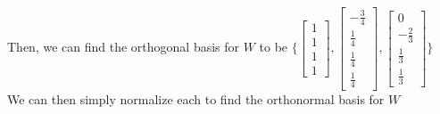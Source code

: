 \documentclass{report}
\begin{document}
\begin{center}
	Then, we can find the orthogonal basis for $W$ to be $\{\begin{bmatrix} 1 \\ 1 \\ 1 \\ 1 \end{bmatrix}, \begin{bmatrix} -\frac{3}{4} \\ \frac{1}{4} \\ \frac{1}{4} \\ \frac{1}{4} \end{bmatrix}, \begin{bmatrix} 0 \\ -\frac{2}{3} \\ \frac{1}{3} \\ \frac{1}{3} \end{bmatrix} \}$\\\vspace{3mm}
	We can then simply normalize each to find the orthonormal basis for $W$
\end{center}
\end{document}
